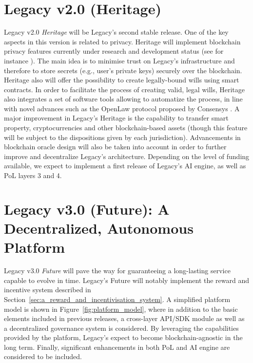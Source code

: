 
\section{Legacy v2.0 (Heritage)} %
\label{sec:legacy_v2_0_heritage}
Legacy v2.0 \textit{Heritage} will be Legacy’s second stable release. 
One of the key aspects in this version is related to privacy. 
Heritage will implement blockchain privacy features currently under research and development status (see for instance \cite{keep}). The main idea is to minimise trust on Legacy's infrastructure and therefore to store secrets (e.g., user's private keys) securely over the blockchain.
Heritage also will offer the possibility to create legally-bound wills using smart contracts.
In order to facilitate the process of creating valid, legal wills, Heritage also integrates a set of software tools allowing to automatize the process, in line with novel advances such as the OpenLaw protocol proposed by Consensys \cite{OpenLaw}.
A major improvement in Legacy's Heritage is the capability to transfer smart property, cryptocurrencies and other blockchain-based assets (though this feature will be subject to the dispositions given by each jurisdiction).
Advancements in blockchain oracle design will also be taken into account in order to further improve and decentralize Legacy's architecture.
Depending on the level of funding available, we expect to implement a first release of Legacy's AI engine, as well as PoL layers 3 and 4.

\section{Legacy v3.0 (Future): A Decentralized, Autonomous Platform} %
\label{sec:lgacy_v3_0}
Legacy v3.0 \textit{Future} will pave the way for guaranteeing a long-lasting service capable to evolve in time. Legacy's Future will notably implement the reward and incentive system described in Section~\ref{sec:a_reward_and_incentivisation_system}.
A simplified platform model is shown in Figure~\ref{fig:platform_model}, where in addition to the basic elements included in previous releases, a cross-layer API/SDK module as well as a decentralized governance system is considered.
By leveraging the capabilities provided by the platform, Legacy's expect to become blockchain-agnostic in the long term.
Finally, significant enhancements in both PoL and AI engine are considered to be included.


